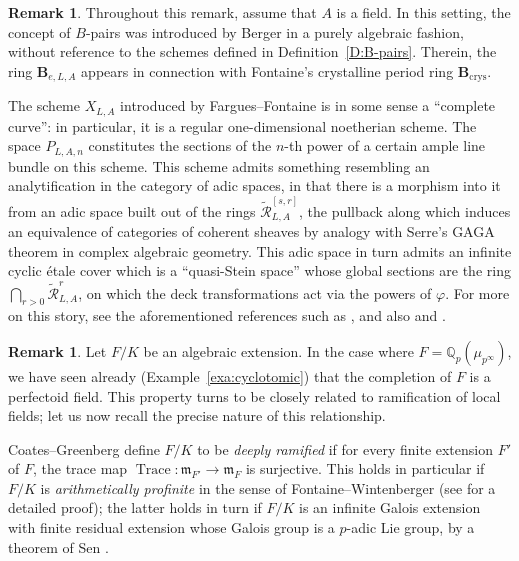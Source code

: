 \documentclass[12pt]{amsart}
\theoremstyle{definition}
\newtheorem{remark}[theorem]{Remark}
\numberwithin{equation}{theorem}
\newcommand{\bB}{\mathbf{B}}
\newcommand{\QQ}{\mathbb{Q}}
\newcommand{\calR}{\mathcal{R}}
\newcommand{\frakm}{\mathfrak{m}}
\DeclareMathOperator{\Trace}{Trace}
\begin{document}
\begin{remark}
Throughout this remark, assume that $A$ is a field.
In this setting, the concept of $B$-pairs was introduced by Berger \cite{berger-b-pairs}
in a purely algebraic fashion,
without reference to the schemes defined in Definition~\ref{D:B-pairs}. Therein,
the ring $\bB_{e,L,A}$ appears in connection with Fontaine's crystalline period ring
$\bB_{\mathrm{crys}}$.

The scheme $X_{L,A}$ introduced by Fargues--Fontaine is in some sense a ``complete curve'': in particular, it is a regular one-dimensional noetherian scheme.
The space $P_{L,A,n}$ constitutes the sections of the $n$-th power of a certain ample line bundle on this scheme. This scheme admits something resembling an analytification in the category of adic spaces, in that there is a morphism into it from an adic space built out of the rings $\tilde{\calR}^{[s,r]}_{L,A}$, the pullback along which induces an equivalence of categories of coherent sheaves by analogy with Serre's GAGA theorem in complex algebraic geometry. This adic space in turn admits an infinite cyclic \'etale cover which is
a ``quasi-Stein space'' whose global sections are the ring $\bigcap_{r>0} \tilde{\calR}^r_{L,A}$, on which the deck transformations act via the powers of $\varphi$.
For more on this story, see the aforementioned references such as \cite{fargues-fontaine},
and also \cite[\S 8.7, 8.8]{kedlaya-liu1} and \cite[\S 4.7]{kedlaya-liu2}.
\end{remark}

\begin{remark} \label{R:deeply ramified}
Let $F/K$ be an algebraic extension. In the case where $F = \QQ_p(\mu_{p^\infty})$, we have seen already (Example~\ref{exa:cyclotomic}) that the completion of $F$ is a perfectoid field. 
This property turns to be closely related to ramification of local fields; let us now recall the precise nature of this relationship.

Coates--Greenberg \cite{coates-greenberg} define $F/K$ to be
\emph{deeply ramified} if for every finite extension $F'$ of $F$, the trace map
$\Trace: \frakm_{F'} \to \frakm_F$ is surjective. This holds in particular if $F/K$ is 
\emph{arithmetically profinite} in the sense of Fontaine--Wintenberger
\cite{fontaine-wintenberger} (see \cite[Corollary~1.5]{fesenko} for a detailed proof);
the latter holds in turn if $F/K$ is an infinite Galois extension with finite residual extension whose Galois group is a $p$-adic Lie group, by a theorem of Sen \cite{sen-lie}.
\end{remark}
\end{document}
